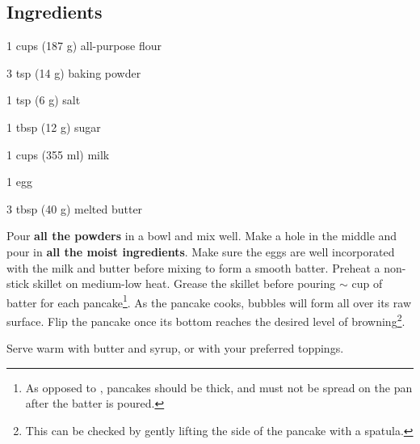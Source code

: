 \newpage
{}

\subsection*{Ingredients}
\begin{ingredients}
	\item 1 cups (187 g) all-purpose flour
	\item 3 tsp (14 g) baking powder
	\item 1 tsp (6 g) salt
	\item 1 tbsp (12 g) sugar
	\item 1 cups (355 ml) milk
	\item 1 egg
	\item 3 tbsp (40 g) melted butter
\end{ingredients}

\medskip

Pour \textbf{all the powders} in a bowl and mix well. 
Make a hole in the middle and pour in \textbf{all the moist ingredients}. 
Make sure the eggs are well incorporated with the milk and butter before mixing to form a smooth batter.
Preheat a non-stick skillet on medium-low heat. 
Grease the skillet before pouring $\sim$ cup of batter for each pancake\footnote{As opposed to , pancakes should be thick, and must not be spread on the pan after the batter is poured.}. As the pancake cooks, bubbles will form all over its raw surface.
Flip the pancake once its bottom reaches the desired level of browning\footnote{This can be checked by gently lifting the side of the pancake with a spatula.}.

Serve warm with butter and syrup, or with your preferred toppings.

\vspace*{0.75 cm}

\begin{recipeblock}
	\noindent 
\end{recipeblock}